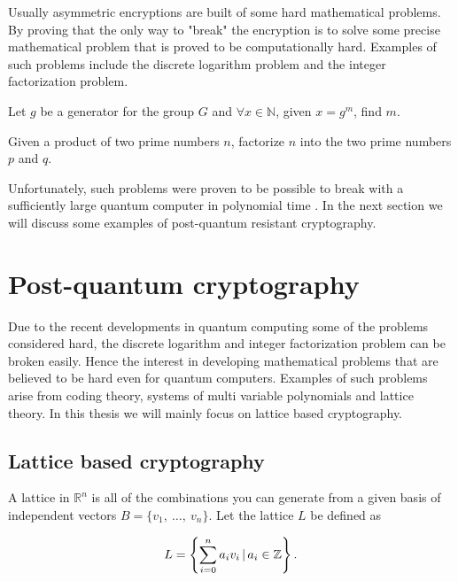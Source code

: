 Usually asymmetric encryptions are built of some hard mathematical problems.
By proving that the only way to "break" the encryption is to solve some
precise mathematical problem that is proved to be computationally hard.
Examples of such problems include the discrete logarithm problem and the
integer factorization problem.

\begin{definition}

    Let $g$ be a generator for the group $G$ and $\forall x \in \mathbb{N}$,
    given $x = g^m$, find $m$.

\end{definition}

\begin{definition}

    Given a product of two prime numbers $n$, factorize $n$ into the two prime
    numbers $p$ and $q$.

\end{definition}

Unfortunately, such problems were proven to be possible to break with a
sufficiently large quantum computer in polynomial time \citep{ShorQuantum}. In
the next section we will discuss some examples of post-quantum resistant
cryptography.


\section{Post-quantum cryptography}

Due to the recent developments in quantum computing some of the problems
considered hard, the discrete logarithm and integer factorization problem can
be broken easily. Hence the interest in developing mathematical problems that
are believed to be hard even for quantum computers. Examples of such problems
arise from coding theory, systems of multi variable polynomials and lattice
theory. In this thesis we will mainly focus on lattice based cryptography.


\subsection{Lattice based cryptography}

\begin{definition}
    A lattice in $\mathbb{R}^n$ is all of the combinations you can generate
    from a given basis of independent vectors $B = \{v_1,\ \ldots,\ v_n\}$. Let
    the lattice $L$ be defined as

    \[L = \left\{ \sum_{i = 0}^n a_iv_i \, | \, a_i \in \mathbb{Z} \right\}.\]
\end{definition}


